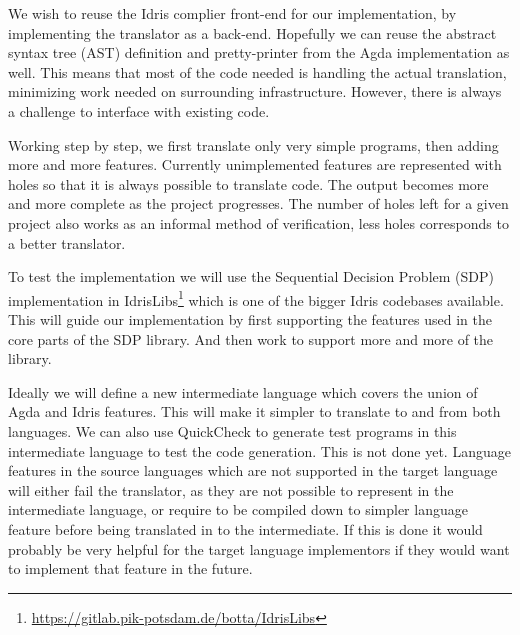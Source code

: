 \documentclass[parskip=half]{scrartcl}
\begin{document}




We wish to reuse the Idris complier front-end for our implementation, by
implementing the translator as a back-end. Hopefully we can reuse the abstract
syntax tree (AST) definition and pretty-printer from the Agda implementation as
well. This means that most of the code needed is handling the actual
translation, minimizing work needed on surrounding infrastructure.  However,
there is always a challenge to interface with existing code.


Working step by step, we first translate only very simple programs, then adding
more and more features. Currently unimplemented features are represented with
holes so that it is always possible to translate code. The output becomes more
and more complete as the project progresses. The number of holes left for
a given project also works as an informal method of verification, less holes
corresponds to a better translator.

To test the implementation we will use the Sequential Decision Problem (SDP)
implementation in
IdrisLibs\footnote{\url{https://gitlab.pik-potsdam.de/botta/IdrisLibs}} which
is one of the bigger Idris codebases available. This will guide our
implementation by first supporting the features used in the core parts of the
SDP library. And then work to support more and more of the library.


Ideally we will define a new intermediate language which covers the union of
Agda and Idris features. This will make it simpler to translate to and from
both languages. We can also use QuickCheck to generate test programs in this
intermediate language to test the code generation. This is not done yet.
Language features in the source languages which are not supported in the target
language will either fail the translator, as they are not possible to represent
in the intermediate language, or require to be compiled down to simpler
language feature before being translated in to the intermediate. If this is
done it would probably be very helpful for the target language implementors if
they would want to implement that feature in the future.
\end{document}
